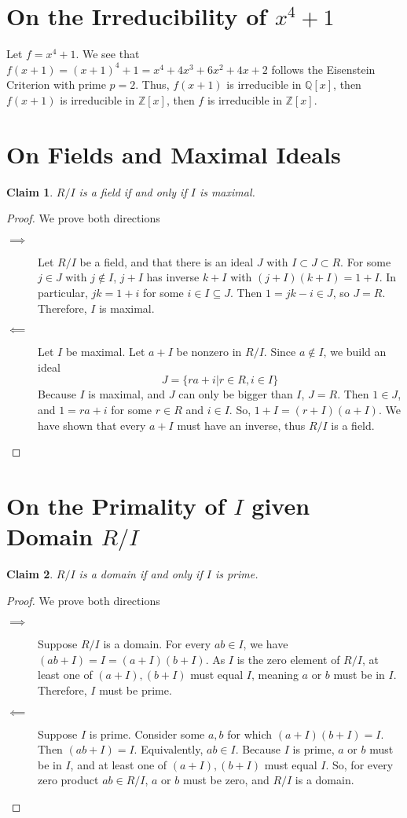 \documentclass[12pt]{article}
\newtheorem*{claim*}{Claim}
\newcommand*{\Z}{\mathbb{Z}}
\newcommand*{\Q}{\mathbb{Q}}
\begin{document}
\section{On the Irreducibility of $x^4 + 1$}
Let $f = x^4 + 1$. We see that $f(x + 1) = (x + 1)^4 + 1 = x^4+4 x^3+6 x^2+4 x+2$ follows the Eisenstein Criterion with prime $p = 2$. Thus, $f(x + 1)$ is irreducible in $\Q[x]$, then $f(x + 1)$ is irreducible in $\Z[x]$, then $f$ is irreducible in $\Z[x]$.

\section{On Fields and Maximal Ideals}
\begin{claim*}
$R / I$ is a field if and only if $I$ is maximal.
\end{claim*}
\begin{proof} We prove both directions
\begin{description}
\item[$\implies$] Let $R/I$ be a field, and that there is an ideal $J$ with $I \subset J \subset R$. For some $j \in J$ with $j \notin I$, $j + I$ has inverse $k + I$ with $(j + I)(k + I) = 1 + I$. In particular, $jk = 1 + i$ for some $i \in I \subseteq J$. Then $1 = jk - i\in J$, so $J = R$. Therefore, $I$ is maximal.

\item[$\impliedby$] Let $I$ be maximal. Let $a + I$ be nonzero in $R/I$. Since $a \notin I$, we build an ideal 
\[ J = \{ ra + i | r \in R, i \in I\}\]
\noindent Because $I$ is maximal, and $J$ can only be bigger than $I$, $J = R$. Then $1 \in J$, and $1 = ra + i$ for some $r \in R$ and $i \in I$. So, $1 + I = (r + I)(a + I)$. We have shown that every $a + I$ must have an inverse, thus $R/I$ is a field.
\end{description}
\end{proof}

\section{On the Primality of $I$ given Domain $R/I$}
\begin{claim*}
$R/I$ is a domain if and only if $I$ is prime.
\end{claim*}
\begin{proof} We prove both directions
\begin{description}
\item[$\implies$] Suppose $R/I$ is a domain. For every $ab \in I$, we have $(ab + I) = I = (a + I)(b + I)$. As $I$ is the zero element of $R/I$, at least one of $(a + I), (b + I)$ must equal $I$, meaning $a$ or $b$ must be in $I$. Therefore, $I$ must be prime.

\item[$\impliedby$] Suppose $I$ is prime. Consider some $a,b$ for which $(a + I)(b + I) = I$. Then $(ab + I) = I$. Equivalently, $ab \in I$. Because $I$ is prime, $a$ or $b$ must be in $I$, and at least one of $(a + I), (b + I)$ must equal $I$. So, for every zero product $ab \in R/I$, $a$ or $b$ must be zero, and $R/I$ is a domain.   
\end{description}
\end{proof}
\end{document}
